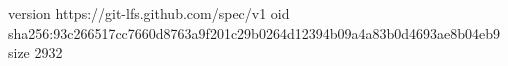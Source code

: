 version https://git-lfs.github.com/spec/v1
oid sha256:93c266517cc7660d8763a9f201c29b0264d12394b09a4a83b0d4693ae8b04eb9
size 2932

